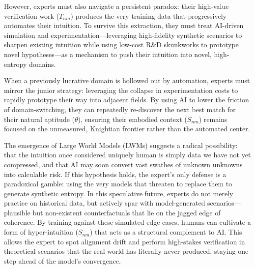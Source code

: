 \documentclass[12pt, letter]{article}
\begin{document}
\begin{enumerate}
\begin{itemize}
        However, experts must also navigate a persistent paradox: their high-value verification work ($T_{nm}$) produces the very training data that progressively automates their intuition. To survive this extraction, they must treat AI-driven simulation and experimentation—leveraging high-fidelity synthetic scenarios to sharpen existing intuition while using low-cost R\&D skunkworks to prototype novel hypotheses—as a mechanism to push their intuition into novel, high-entropy domains.
        
        When a previously lucrative domain is hollowed out by automation, experts must mirror the junior strategy: leveraging the collapse in experimentation costs to rapidly prototype their way into adjacent fields. By using AI to lower the friction of domain-switching, they can repeatedly re-discover the next best match for their natural aptitude ($\theta$), ensuring their embodied context ($S_{nm}$) remains focused on the unmeasured, Knightian frontier rather than the automated center.

        The emergence of Large World Models (LWMs) suggests a radical possibility: that the intuition once considered uniquely human is simply data we have not yet compressed, and that AI may soon convert vast swathes of unknown unknowns into calculable risk. If this hypothesis holds, the expert’s only defense is a paradoxical gamble: using the very models that threaten to replace them to generate synthetic entropy. In this speculative future, experts do not merely practice on historical data, but actively spar with model-generated scenarios—plausible but non-existent counterfactuals that lie on the jagged edge of coherence. By training against these simulated edge cases, humans can cultivate a form of hyper-intuition ($S_{nm}$) that acts as a structural complement to AI. This allows the expert to spot alignment drift and perform high-stakes verification in theoretical scenarios that the real world has literally never produced, staying one step ahead of the model's convergence.


\end{itemize}
\end{enumerate}
\end{document}
